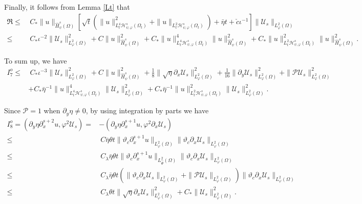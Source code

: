 \documentclass{amsart}
\numberwithin{equation}{section}
\begin{document}
Finally, it follows from Lemma \ref{Lt} that
\begin{align*}
\mathfrak{R}
\leq&~C_{*}\|u\|_{\hat{H}_{\psi}^{s}(\Omega)}
           \left[\sqrt{t}\left(\|u\|_{L_{t}^{4}\mathcal{H}_{\psi,\varphi}^{s}(\Omega_{t})}^{2}+\|u\|_{L_{t}^{2}\mathcal{H}_{\psi,\varphi}^{s}(\Omega_{t})}\right)
                 +\bar{\eta}t+\check{c}\iota^{-1}\right]
           \|\mathcal{U}_{s}\|_{L_{\varphi}^{2}(\Omega)}\\
\leq&~C_{*}\iota^{-2}\|\mathcal{U}_{s}\|_{L_{\varphi}^{2}(\Omega)}^{2}
     +C\|u\|_{\hat{H}_{\psi}^{s}(\Omega)}^{2}
     +C_{*}\|u\|_{L_{t}^{4}\mathcal{H}_{\psi,\varphi}^{s}(\Omega_{t})}^{4}\|u\|_{\hat{H}_{\psi}^{s}(\Omega)}^{2}
     +C_{*}\|u\|_{L_{t}^{2}\mathcal{H}_{\psi,\varphi}^{s}(\Omega_{t})}^{2}\|u\|_{\hat{H}_{\psi}^{s}(\Omega)}^{2}.
\end{align*}


To sum up, we have
\begin{align*}
I_{7}^{o}
\leq&~C_{*}\iota^{-3}\|\mathcal{U}_{s}\|_{L_{\varphi}^{2}(\Omega)}^{2}
     +C\|u\|_{\hat{H}_{\psi}^{s}(\Omega)}^{2}
     +\frac{1}{8}\|\sqrt{\eta}\partial_{x}\mathcal{U}_{s}\|_{L_{\varphi}^{2}(\Omega)}^{2}
     +\frac{1}{16}\|\partial_{y}\mathcal{U}_{s}\|_{L_{\varphi}^{2}(\Omega)}^{2}
     +\|\mathcal{P}\mathcal{U}_{s}\|_{L_{\varphi}^{2}(\Omega)}^{2}\\
    &+C_{*}\bar{\eta}^{-1}\|u\|_{L_{t}^{4}\mathcal{H}_{\psi,\varphi}^{s}(\Omega_{t})}^{4}\|\mathcal{U}_{s}\|_{L_{\varphi}^{2}(\Omega)}^{2}
     +C_{*}\bar{\eta}^{-1}\|u\|_{L_{t}^{2}\mathcal{H}_{\psi,\varphi}^{s}(\Omega_{t})}^{2}\|\mathcal{U}_{s}\|_{L_{\varphi}^{2}(\Omega)}^{2}.
\end{align*}

 Since $\mathcal{P}=1$ when $\partial_{y}\eta\neq 0$, by using integration by parts we have
\begin{align*}
I_{8}^{o}
=(\partial_{y}\eta\partial_{x}^{s+2}u,\varphi^{2}\mathcal{U}_{s})
=&-(\partial_{y}\eta\partial_{x}^{s+1}u,\varphi^{2}\partial_{x}\mathcal{U}_{s})\\
\leq&~C\bar{\eta}\theta t\|\vartheta_{c}\partial_{x}^{s+1}u\|_{L_{\varphi}^{2}(\Omega)}
                         \|\vartheta_{c}\partial_{x}\mathcal{U}_{s}\|_{L_{\varphi}^{2}(\Omega)}\\
\leq&~C_{\lambda}\bar{\eta}\theta t\|\vartheta_{c}\partial_{x}^{s+1}u\|_{L_{\hat{\Psi}}^{2}(\Omega)}
                                   \|\vartheta_{c}\partial_{x}\mathcal{U}_{s}\|_{L_{\varphi}^{2}(\Omega)}\\
\leq&~C_{\lambda}\bar{\eta}\theta t
     \left(\|\vartheta_{c}\partial_{x}\mathcal{U}_{s}\|_{L_{\varphi}^{2}(\Omega)}+\|\mathcal{P}\mathcal{U}_{s}\|_{L_{\varphi}^{2}(\Omega)}\right)
     \|\vartheta_{c}\partial_{x}\mathcal{U}_{s}\|_{L_{\varphi}^{2}(\Omega)}\\
\leq&~C_{\lambda}\theta t\|\sqrt{\eta}\partial_{x}\mathcal{U}_{s}\|_{L_{\varphi}^{2}(\Omega)}^{2}
     +C_{*}\|\mathcal{U}_{s}\|_{L_{\varphi}^{2}(\Omega)}^{2}.
\end{align*}
\end{document}
